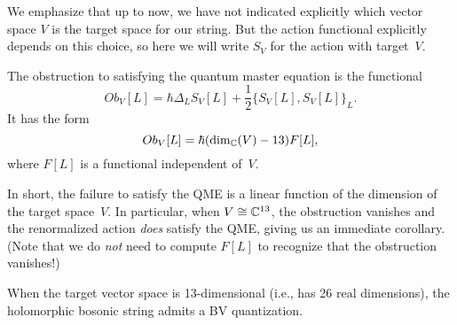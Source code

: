 We emphasize that up to now, we have not indicated explicitly which vector space $V$ is the target space for our string.
But the action functional explicitly depends on this choice,
so here we will write $S_V$ for the action with target~$V$.

\begin{prop}
The obstruction to satisfying the quantum master equation is the functional
\[
Ob_V[L] = \hbar \Delta_{L} S_V[L] + \frac{1}{2}\{S_V[L],S_V[L]\}_L.
\]
It has the form
\[
Ob_V[L] = \hbar (\dim_\mathbb C(V) - 13) F[L],
\]
where $F[L]$ is a functional independent of~$V$.
\end{prop}

In short, the failure to satisfy the QME is a linear function of the dimension of the target space~$V$.
In particular, when $V \cong \mathbb C^{13}$, 
the obstruction vanishes and the renormalized action {\em does} satisfy the QME, 
giving us an immediate corollary.
(Note that we do {\em not} need to compute $F[L]$ to recognize that the obstruction vanishes!)

\begin{cor}
When the target vector space is 13-dimensional (i.e., has 26 real dimensions),
the holomorphic bosonic string admits a BV quantization.
\end{cor}

